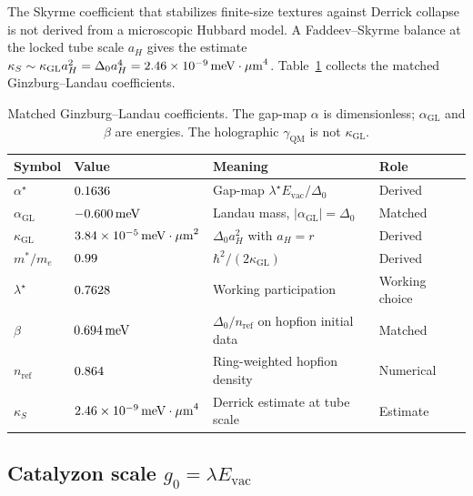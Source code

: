 The Skyrme coefficient that stabilizes finite-size textures against Derrick collapse is not derived from a microscopic Hubbard model. A Faddeev--Skyrme balance at the locked tube scale $a_H$ gives the estimate $\kappa_S\sim\kappa_{\mathrm{GL}}a_H^2=\Delta_0 a_H^4=2.46\times 10^{-9}\,\mathrm{meV\cdot\mu m}^{4}$. Table~\ref{tab:gl_dict} collects the matched Ginzburg--Landau coefficients.

\begin{table}[htbp]
\centering
\caption{Matched Ginzburg--Landau coefficients. The gap-map $\alpha$ is dimensionless; $\alpha_{\mathrm{GL}}$ and $\beta$ are energies. The holographic $\gamma_{\mathrm{QM}}$ is not $\kappa_{\mathrm{GL}}$.}
\begin{tabular}{llll}
\hline
\textbf{Symbol} & \textbf{Value} & \textbf{Meaning} & \textbf{Role} \\
\hline
$\alpha^\star$ & $0.1636$ & Gap-map $\lambda^\star E_{\mathrm{vac}}/\Delta_0$ & Derived \\
$\alpha_{\mathrm{GL}}$ & $-0.600\,\mathrm{meV}$ & Landau mass, $|\alpha_{\mathrm{GL}}|=\Delta_0$ & Matched \\
$\kappa_{\mathrm{GL}}$ & $3.84\times 10^{-5}\,\mathrm{meV\cdot\mu m}^{2}$ & $\Delta_0 a_H^2$ with $a_H=r$ & Derived \\
$m^*/m_e$ & $0.99$ & $\hbar^2/(2\kappa_{\mathrm{GL}})$ & Derived \\
$\lambda^\star$ & $0.7628$ & Working participation & Working choice \\
$\beta$ & $0.694\,\mathrm{meV}$ & $\Delta_0/n_{\mathrm{ref}}$ on hopfion initial data & Matched \\
$n_{\mathrm{ref}}$ & $0.864$ & Ring-weighted hopfion density & Numerical \\
$\kappa_S$ & $2.46\times 10^{-9}\,\mathrm{meV\cdot\mu m}^{4}$ & Derrick estimate at tube scale & Estimate \\
\hline
\end{tabular}
\label{tab:gl_dict}
\end{table}

\subsection{Catalyzon scale \texorpdfstring{$g_0=\lambda E_{\mathrm{vac}}$}{g0 = lambda E\_vac}}
\label{sec:g0_dict}

